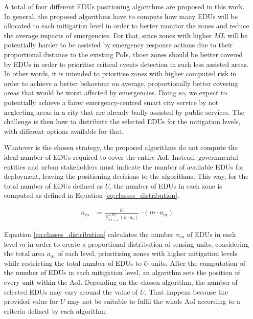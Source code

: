 \begin{refsection}
A total of four different EDUs positioning algorithms are proposed in this work. In general, the proposed algorithms have to compute how many EDUs will be allocated to each mitigation level in order to better monitor the zones and reduce the average impacts of emergencies. For that, since zones with higher $ML$ will be potentially harder to be assisted by emergency response actions due to their proportional distance to the existing PoIs, those zones should be better covered by EDUs in order to prioritise critical events detection in such less assisted areas. In other words, it is intended to prioritise zones with higher computed risk in order to achieve a better behaviour on average, proportionally better covering areas that would be worst affected by emergencies. Doing so, we expect to potentially achieve a fairer emergency-centred smart city service by not neglecting areas in a city that are already badly assisted by public services. The challenge is then how to distribute the selected EDUs for the mitigation levels, with different options available for that.

Whatever is the chosen strategy, the proposed algorithms do not compute the ideal number of EDUs required to cover the entire AoI. Instead, governmental entities and urban stakeholders must indicate the number of available EDUs for deployment, leaving the positioning decisions to the algorithms. This way, for the total number of EDUs defined as $U$, the number of EDUs in each zone is computed as defined in Equation \ref{eq:classes_distribution}.

\begin{equation}
  \label{eq:classes_distribution}
  \begin{split}
    \displaystyle n_m &= \frac{U}{\displaystyle\sum_{h = 1}^{|M|}\left(h \cdot a_h\right)} \cdot (m \cdot a_m)
  \end{split}
\end{equation}

Equation \ref{eq:classes_distribution} calculates the number $n_m$ of EDUs in each level $m$ in order to create a proportional distribution of sensing units, considering the total area $a_m$ of each level, prioritising zones with higher mitigation levels while restricting the total number of EDUs to $U$ units. After the computation of the number of EDUs in each mitigation level, an algorithm sets the position of every unit within the AoI. Depending on the chosen algorithm, the number of selected EDUs may vary around the value of $U$. That happens because the provided value for $U$ may not be suitable to fulfil the whole AoI according to a criteria defined by each algorithm.


\end{refsection}
